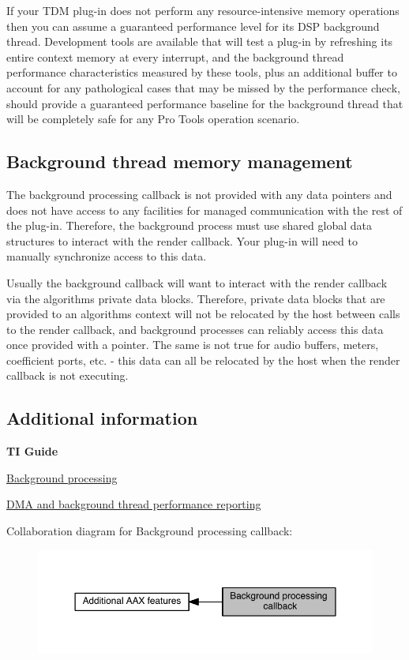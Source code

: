 If your T\+D\+M plug-\/in does not perform any resource-\/intensive memory operations then you can assume a guaranteed performance level for its D\+S\+P background thread. Development tools are available that will test a plug-\/in by refreshing its entire context memory at every interrupt, and the background thread performance characteristics measured by these tools, plus an additional buffer to account for any pathological cases that may be missed by the performance check, should provide a guaranteed performance baseline for the background thread that will be completely safe for any Pro Tools operation scenario.\hypertarget{a00341_alg_bg_memmgmt}{}\subsection{Background thread memory management}\label{a00341_alg_bg_memmgmt}
The background processing callback is not provided with any data pointers and does not have access to any facilities for managed communication with the rest of the plug-\/in. Therefore, the background process must use shared global data structures to interact with the render callback. Your plug-\/in will need to manually synchronize access to this data.

Usually the background callback will want to interact with the render callback via the algorithm\textquotesingle{}s private data blocks. Therefore, private data blocks that are provided to an algorithm\textquotesingle{}s context will not be relocated by the host between calls to the render callback, and background processes can reliably access this data once provided with a pointer. The same is not true for audio buffers, meters, coefficient ports, etc. -\/ this data can all be relocated by the host when the render callback is not executing.\hypertarget{a00341_alg_bg_additionalinformation}{}\subsection{Additional information}\label{a00341_alg_bg_additionalinformation}
{\bfseries T\+I Guide} \begin{DoxyItemize}
\item \hyperlink{a00362_subsubsection__background_processing_}{Background processing} \item \hyperlink{a00362_subsubsection__dma_and_background_thread_performance_reporting_}{D\+M\+A and background thread performance reporting} \end{DoxyItemize}
Collaboration diagram for Background processing callback\+:
\nopagebreak
\begin{figure}[H]
\begin{center}
\leavevmode
\includegraphics[width=350pt]{a00341}
\end{center}
\end{figure}
